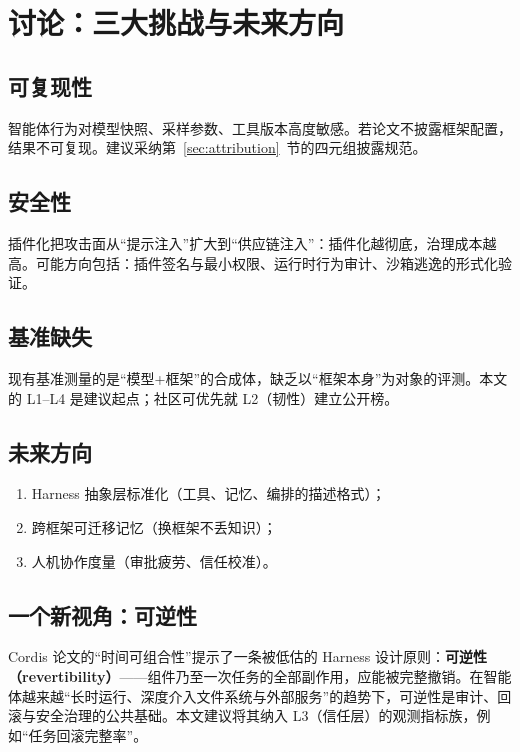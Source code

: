 \documentclass[11pt,a4paper]{ctexart}
\begin{document}
\section{讨论：三大挑战与未来方向}

\subsection{可复现性}

智能体行为对模型快照、采样参数、工具版本高度敏感。若论文不披露框架配置，结果不可复现。建议采纳第~\ref{sec:attribution}~节的四元组披露规范。

\subsection{安全性}

插件化把攻击面从“提示注入”扩大到“供应链注入”：插件化越彻底，治理成本越高。可能方向包括：插件签名与最小权限、运行时行为审计、沙箱逃逸的形式化验证。

\subsection{基准缺失}

现有基准测量的是“模型+框架”的合成体，缺乏以“框架本身”为对象的评测。本文的 L1--L4 是建议起点；社区可优先就 L2（韧性）建立公开榜。

\subsection{未来方向}

\begin{enumerate}
  \item Harness 抽象层标准化（工具、记忆、编排的描述格式）；
  \item 跨框架可迁移记忆（换框架不丢知识）；
  \item 人机协作度量（审批疲劳、信任校准）。
\end{enumerate}

\subsection{一个新视角：可逆性}

Cordis 论文的“时间可组合性”提示了一条被低估的 Harness 设计原则：\textbf{可逆性（revertibility）}——组件乃至一次任务的全部副作用，应能被完整撤销。在智能体越来越“长时运行、深度介入文件系统与外部服务”的趋势下，可逆性是审计、回滚与安全治理的公共基础。本文建议将其纳入 L3（信任层）的观测指标族，例如“任务回滚完整率”。
\end{document}

